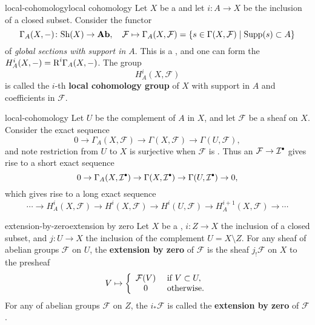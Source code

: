 \begin{topic}{local-cohomology}{local cohomology}
    Let $X$ be a  and let $i \colon A \to X$ be the inclusion of a closed subset. Consider the functor
    \[ \Gamma_A(X, -) \colon \textup{Sh}(X) \to \textbf{Ab}, \quad \mathcal{F} \mapsto \Gamma_A(X, \mathcal{F}) = \{ s \in \Gamma(X, \mathcal{F}) \mid \textup{Supp}(s) \subset A \} \]
    of \textit{global sections with support in $A$}. This is a , and one can form the  $H_A^i(X, -) = \textup{R}^i \Gamma_A(X, -)$. The group
    \[ H_A^i(X, \mathcal{F}) \]
    is called the $i$-th \textbf{local cohomology group} of $X$ with support in $A$ and coefficients in $\mathcal{F}$.
\end{topic}

\begin{example}{local-cohomology}
    Let $U$ be the complement of $A$ in $X$, and let $\mathcal{F}$ be a sheaf on $X$. Consider the exact sequence
    \[ 0 \to \Gamma_A(X, \mathcal{F}) \to \Gamma(X, \mathcal{F}) \to \Gamma(U, \mathcal{F}) , \]
    and note restriction from $U$ to $X$ is surjective when $\mathcal{F}$ is . Thus an  $\mathcal{F} \to \mathcal{I}^\bdot$ gives rise to a short exact sequence
    \[ 0 \to \Gamma_A(X, \mathcal{I}^\bdot) \to \Gamma(X, \mathcal{I}^\bdot) \to \Gamma(U, \mathcal{I}^\bdot) \to 0 , \]
    which gives rise to a long exact sequence
    \[ \cdots \to H_A^i(X, \mathcal{F}) \to H^i(X, \mathcal{F}) \to H^i(U, \mathcal{F}) \to H_A^{i + 1}(X, \mathcal{F}) \to \cdots \]
\end{example}

\begin{topic}{extension-by-zero}{extension by zero}
    Let $X$ be a , $i \colon Z \to X$ the inclusion of a closed subset, and $j \colon U \to X$ the inclusion of the complement $U = X \setminus Z$. For any sheaf of abelian groups $\mathcal{F}$ on $U$, the \textbf{extension by zero} of $\mathcal{F}$ is the sheaf $j_! \mathcal{F}$ on $X$  to the presheaf
    \[ V \mapsto \left\{ \begin{array}{cl}
        \mathcal{F}(V) & \textup{ if } V \subset U , \\
        0 & \textup{ otherwise} .
    \end{array} \right. \]
    For any  of abelian groups $\mathcal{F}$ on $Z$, the  $i_* \mathcal{F}$ is called the \textbf{extension by zero} of $\mathcal{F}$.
\end{topic}

